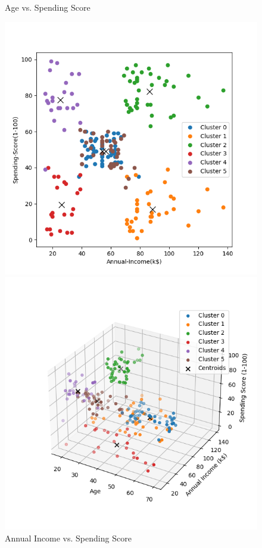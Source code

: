 \documentclass[8pt]{article}
\begin{document}
\begin{figure}[H]
\begin{minipage}{0.32\textwidth}
        \caption{Age vs. Spending Score}
        \label{fig: Age vs. Spending Score k6 rand14 pp}
    \end{minipage}
    \hfill
    \begin{minipage}{0.32\textwidth}
        \centering
        \includegraphics[width=\textwidth]{./Prob4/out/task2_rand14/images/cluster_result_k6_1_2.png}
        \caption{Annual Income vs. Spending Score}
        \label{fig: Annual Income vs. Spending Score k6 rand14 pp}
    \end{minipage}
    \hfill
    \begin{minipage}{0.32\textwidth}
        \centering
        \includegraphics[width=\textwidth]{./Prob4/out/task2_rand14/images/cluster_result_k6_3d.png}

\end{minipage}
\end{figure}
\end{document}
